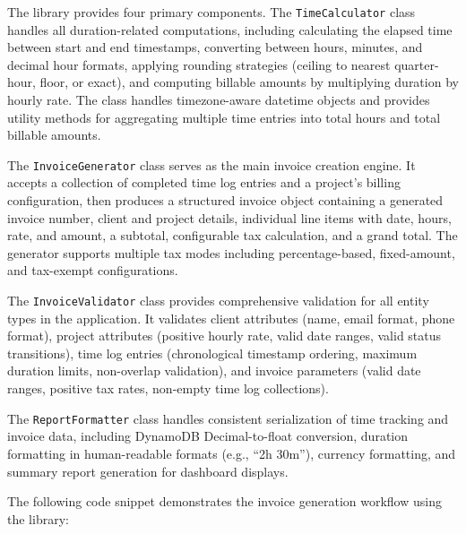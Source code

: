 \documentclass[conference]{IEEEtran}
\begin{document}
The library provides four primary components. The \texttt{TimeCalculator} class handles all duration-related computations, including calculating the elapsed time between start and end timestamps, converting between hours, minutes, and decimal hour formats, applying rounding strategies (ceiling to nearest quarter-hour, floor, or exact), and computing billable amounts by multiplying duration by hourly rate. The class handles timezone-aware datetime objects and provides utility methods for aggregating multiple time entries into total hours and total billable amounts.

The \texttt{InvoiceGenerator} class serves as the main invoice creation engine. It accepts a collection of completed time log entries and a project's billing configuration, then produces a structured invoice object containing a generated invoice number, client and project details, individual line items with date, hours, rate, and amount, a subtotal, configurable tax calculation, and a grand total. The generator supports multiple tax modes including percentage-based, fixed-amount, and tax-exempt configurations.

The \texttt{InvoiceValidator} class provides comprehensive validation for all entity types in the application. It validates client attributes (name, email format, phone format), project attributes (positive hourly rate, valid date ranges, valid status transitions), time log entries (chronological timestamp ordering, maximum duration limits, non-overlap validation), and invoice parameters (valid date ranges, positive tax rates, non-empty time log collections).

The \texttt{ReportFormatter} class handles consistent serialization of time tracking and invoice data, including DynamoDB Decimal-to-float conversion, duration formatting in human-readable formats (e.g., ``2h 30m''), currency formatting, and summary report generation for dashboard displays.

The following code snippet demonstrates the invoice generation workflow using the library:
\end{document}

